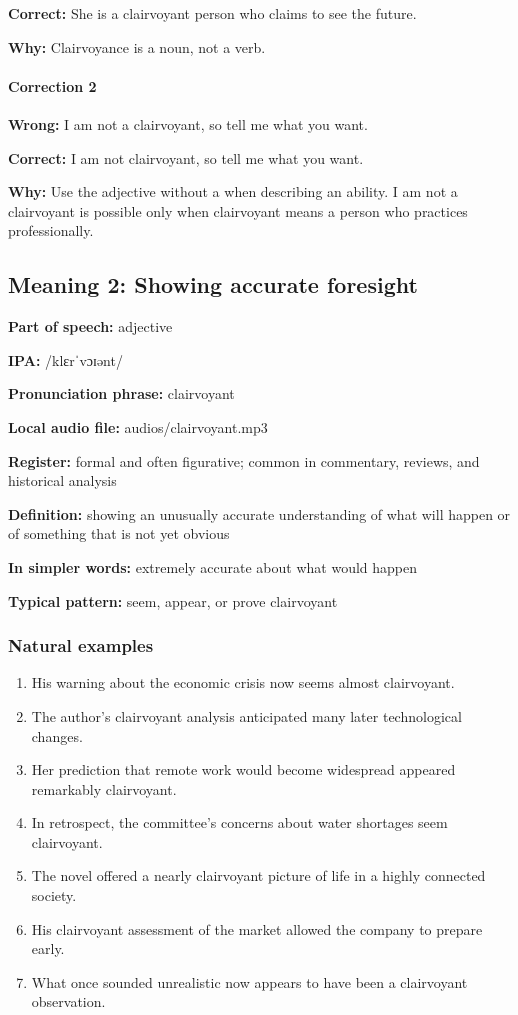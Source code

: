 \documentclass[11pt]{article}
\begin{document}
\textbf{Correct:} She is a clairvoyant person who claims to see the future.

\textbf{Why:} Clairvoyance is a noun, not a verb.

\paragraph{Correction 2}
\textbf{Wrong:} I am not a clairvoyant, so tell me what you want.

\textbf{Correct:} I am not clairvoyant, so tell me what you want.

\textbf{Why:} Use the adjective without a when describing an ability. I am not a clairvoyant is possible only when clairvoyant means a person who practices professionally.

\subsection{Meaning 2: Showing accurate foresight}
\textbf{Part of speech:} adjective

\textbf{IPA:} /klɛrˈvɔɪənt/

\textbf{Pronunciation phrase:} clairvoyant

\textbf{Local audio file:} audios/clairvoyant.mp3

\textbf{Register:} formal and often figurative; common in commentary, reviews, and historical analysis

\textbf{Definition:} showing an unusually accurate understanding of what will happen or of something that is not yet obvious

\textbf{In simpler words:} extremely accurate about what would happen

\textbf{Typical pattern:} seem, appear, or prove clairvoyant

\subsubsection{Natural examples}
\begin{enumerate}
  \item His warning about the economic crisis now seems almost clairvoyant.
  \item The author's clairvoyant analysis anticipated many later technological changes.
  \item Her prediction that remote work would become widespread appeared remarkably clairvoyant.
  \item In retrospect, the committee's concerns about water shortages seem clairvoyant.
  \item The novel offered a nearly clairvoyant picture of life in a highly connected society.
  \item His clairvoyant assessment of the market allowed the company to prepare early.
  \item What once sounded unrealistic now appears to have been a clairvoyant observation.
\end{enumerate}
\end{document}
